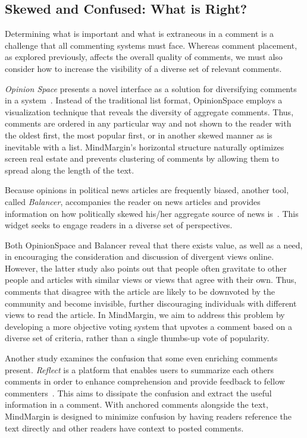 \subsection{Skewed and Confused: What is Right?}
Determining what is important and what is extraneous in a comment is a challenge that all commenting systems must face. Whereas comment placement, as explored previously, affects the overall quality of comments, we must also consider how to increase the visibility of a diverse set of relevant comments. 

\textit{Opinion Space} presents a novel interface as a solution for diversifying comments in a system~\cite{OpinionSpace}. Instead of the traditional list format, OpinionSpace employs a visualization technique that reveals the diversity of aggregate comments. Thus, comments are ordered in any particular way and not shown to the reader with the oldest first, the most popular first, or in another skewed manner as is inevitable with a list. MindMargin’s horizontal structure naturally optimizes screen real estate and prevents clustering of comments by allowing them to spread along the length of the text. 

Because opinions in political news articles are frequently biased, another tool, called \textit{Balancer}, accompanies the reader on news articles and provides information on how politically skewed his/her aggregate source of news is~\cite{Politics}. This widget seeks to engage readers in a diverse set of perspectives. 

Both OpinionSpace and Balancer reveal that there exists value, as well as a need, in encouraging the consideration and discussion of divergent views online. However, the latter study also points out that people often gravitate to other people and articles with similar views or views that agree with their own. Thus, comments that disagree with the article are likely to be downvoted by the community and become invisible, further discouraging individuals with different views to read the article. In MindMargin, we aim to address this problem by developing a more objective voting system that upvotes a comment based on a diverse set of criteria, rather than a single thumbs-up vote of popularity. 

Another study examines the confusion that some even enriching comments present. \textit{Reflect} is a platform that enables users to summarize each others comments in order to enhance comprehension and provide feedback to fellow commenters~\cite{Reflect}. This aims to dissipate the confusion and extract the useful information in a comment. With anchored comments alongside the text, MindMargin is designed to minimize confusion by having readers reference the text directly and other readers have context to posted comments.


